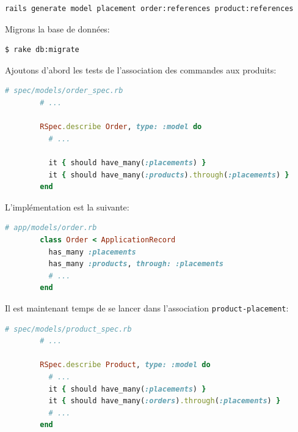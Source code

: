 \documentclass[]{report}
\begin{document}
      \begin{scriptsize}
        \begin{lstlisting}[language=bash]
        rails generate model placement order:references product:references
        \end{lstlisting}
      \end{scriptsize}

      Migrons la base de données:

      \begin{scriptsize}
        \begin{lstlisting}[language=bash]
        $ rake db:migrate
        \end{lstlisting}
      \end{scriptsize}

      Ajoutons d'abord les tests de l'association des commandes aux produits:

      \begin{scriptsize}
        \begin{lstlisting}[language=ruby, caption={Tests de l'association des commandes aux produits}]
        # spec/models/order_spec.rb
        # ...

        RSpec.describe Order, type: :model do
          # ...

          it { should have_many(:placements) }
          it { should have_many(:products).through(:placements) }
        end
        \end{lstlisting}
      \end{scriptsize}

      L'implémentation est la suivante:

      \begin{scriptsize}
        \begin{lstlisting}[language=ruby, caption={Implémentation de l'association des commandes aux produits}]
        # app/models/order.rb
        class Order < ApplicationRecord
          has_many :placements
          has_many :products, through: :placements
          # ...
        end
        \end{lstlisting}
      \end{scriptsize}

      Il est maintenant temps de se lancer dans l'association \verb|product-placement|:

      \begin{scriptsize}
        \begin{lstlisting}[language=ruby]
        # spec/models/product_spec.rb
        # ...

        RSpec.describe Product, type: :model do
          # ...
          it { should have_many(:placements) }
          it { should have_many(:orders).through(:placements) }
          # ...
        end
        \end{lstlisting}
      \end{scriptsize}
\end{document}
